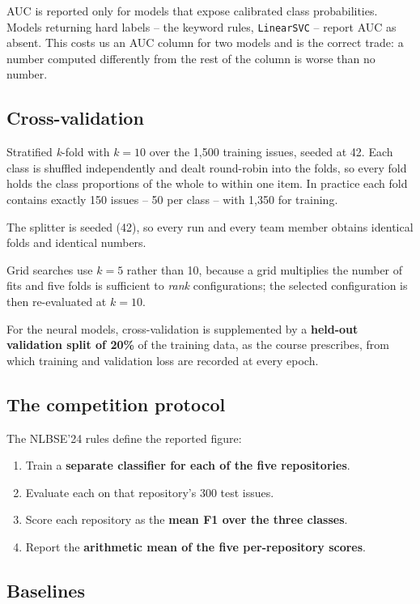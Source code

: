 AUC is reported only for models that expose calibrated class probabilities. Models returning hard labels -- the keyword rules, \texttt{LinearSVC} -- report AUC as absent. This costs us an AUC column for two models and is the correct trade: a number computed differently from the rest of the column is worse than no number.

\subsection{Cross-validation}

Stratified \textit{k}-fold with $k = 10$ over the 1,500 training issues, seeded at 42. Each class is shuffled independently and dealt round-robin into the folds, so every fold holds the class proportions of the whole to within one item. In practice each fold contains exactly 150 issues -- 50 per class -- with 1,350 for training.

The splitter is seeded (42), so every run and every team member obtains identical folds and identical numbers.

Grid searches use $k = 5$ rather than 10, because a grid multiplies the number of fits and five folds is sufficient to \textit{rank} configurations; the selected configuration is then re-evaluated at $k = 10$.

For the neural models, cross-validation is supplemented by a \textbf{held-out validation split of 20\%} of the training data, as the course prescribes, from which training and validation loss are recorded at every epoch.

\subsection{The competition protocol}

The NLBSE'24 rules define the reported figure:

\begin{enumerate}
    \item Train a \textbf{separate classifier for each of the five repositories}.
    \item Evaluate each on that repository's 300 test issues.
    \item Score each repository as the \textbf{mean F1 over the three classes}.
    \item Report the \textbf{arithmetic mean of the five per-repository scores}.
\end{enumerate}

\subsection{Baselines}

